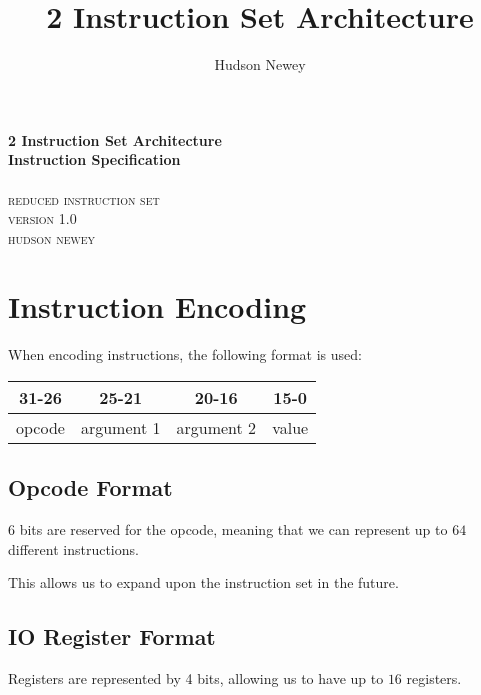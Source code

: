 \documentclass[12pt,a4paper]{article}
\title{ 2 Instruction Set Architecture }
\author{ Hudson Newey }
\begin{document}
\begin{center}
    \huge{\textbf{ 2 Instruction Set Architecture }} \\
    \huge{\textbf{ Instruction Specification }}\\
    \hspace{200pt}\\
    \textsc{ reduced instruction set } \\
    \textsc{ version 1.0 }
    \vspace{280pt}\\
    \textsc{ hudson newey }
\end{center}

\newpage
\tableofcontents
\newpage

\section{Instruction Encoding}

When encoding instructions, the following format is used:

\begin{center}
\begin{tabular}{ c c c c }
    \textbf{31-26} & \textbf{25-21} & \textbf{20-16} & \textbf{15-0} \\
    \hline
    opcode & argument 1 & argument 2 & value \\
\end{tabular}
\end{center}

\subsection{Opcode Format}

$6$ bits are reserved for the opcode, meaning that we can represent up to $64$
different instructions.

This allows us to expand upon the instruction set in the future.

\subsection{IO Register Format}

Registers are represented by 4 bits, allowing us to have up to $16$ registers.
\end{document}
